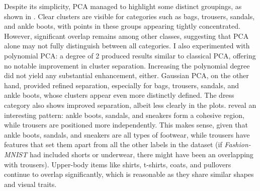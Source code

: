 Despite its simplicity, PCA managed to highlight some distinct groupings, as shown in . Clear 
clusters are visible for categories such as bags, trousers, sandals, and ankle boots, with points in these groups appearing tightly concentrated. 
However, significant overlap remains among other classes, suggesting that PCA alone may not fully distinguish between all categories. I also 
experimented with polynomial PCA: a degree of 2 produced results similar to classical PCA, offering no notable improvement 
in cluster separation. Increasing the polynomial degree did not yield any substantial enhancement, either. Gaussian PCA, on the other hand, 
provided refined separation, especially for bags, trousers, sandals, and ankle boots, whose clusters appear even more distinctly defined. 
The dress category also shows improved separation, albeit less clearly in the plots.  reveal an 
interesting pattern: ankle boots, sandals, and sneakers form a cohesive region, while trousers are positioned more independently. This makes sense, 
given that ankle boots, sandals, and sneakers are all types of footwear, while trousers have features that set them apart from all the other labels 
in the dataset (if \emph{Fashion-MNIST} had included shorts or underwear, there might have been an overlapping with trousers).
Upper-body items like shirts, t-shirts, coats, and pullovers continue to overlap significantly, which is reasonable as they share 
similar shapes and visual traits.

